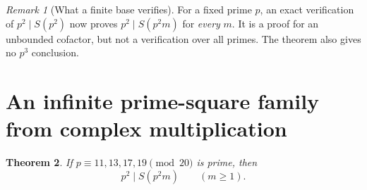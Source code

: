 \documentclass[11pt,a4paper]{article}
\newtheorem{theorem}{Theorem}[section]
\theoremstyle{remark}\newtheorem{remark}[theorem]{Remark}
\begin{document}
\begin{remark}[What a finite base verifies]
For a fixed prime \(p\), an exact verification of \(p^2\mid S(p^2)\)
now proves \(p^2\mid S(p^2m)\) for \emph{every} \(m\).
It is a proof for an unbounded cofactor, but not a verification over
all primes. The theorem also gives no \(p^3\) conclusion.
\end{remark}

\section{An infinite prime-square family from complex multiplication}

\begin{theorem}\label{inert}
If \(p\equiv11,13,17,19\pmod {20}\) is prime, then
\[
                     p^2\mid S(p^2m)\qquad(m\ge1).
\]
\end{theorem}
\end{document}

